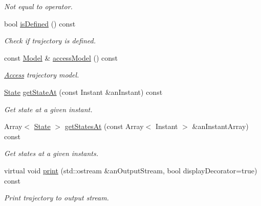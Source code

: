 \begin{DoxyCompactItemize}
\begin{DoxyCompactList}\small\item\em Not equal to operator. \end{DoxyCompactList}\item 
bool \hyperlink{classlibrary_1_1astro_1_1_trajectory_aab36edc2566e11d4b5de340cd8230dee}{is\+Defined} () const
\begin{DoxyCompactList}\small\item\em Check if trajectory is defined. \end{DoxyCompactList}\item 
const \hyperlink{classlibrary_1_1astro_1_1trajectory_1_1_model}{Model} \& \hyperlink{classlibrary_1_1astro_1_1_trajectory_ac5ebd6f282b52bb3d7c74a79375025e1}{access\+Model} () const
\begin{DoxyCompactList}\small\item\em \hyperlink{classlibrary_1_1astro_1_1_access}{Access} trajectory model. \end{DoxyCompactList}\item 
\hyperlink{classlibrary_1_1astro_1_1trajectory_1_1_state}{State} \hyperlink{classlibrary_1_1astro_1_1_trajectory_a5b27c8ad8d547a00ad32c4ab1d63984f}{get\+State\+At} (const Instant \&an\+Instant) const
\begin{DoxyCompactList}\small\item\em Get state at a given instant. \end{DoxyCompactList}\item 
Array$<$ \hyperlink{classlibrary_1_1astro_1_1trajectory_1_1_state}{State} $>$ \hyperlink{classlibrary_1_1astro_1_1_trajectory_a0b7d9ed6012f968b1bfde1f2cc4e34f5}{get\+States\+At} (const Array$<$ Instant $>$ \&an\+Instant\+Array) const
\begin{DoxyCompactList}\small\item\em Get states at a given instants. \end{DoxyCompactList}\item 
virtual void \hyperlink{classlibrary_1_1astro_1_1_trajectory_a6f6afc6bcd8880d7debaa98a79bfa4e6}{print} (std\+::ostream \&an\+Output\+Stream, bool display\+Decorator=true) const
\begin{DoxyCompactList}\small\item\em Print trajectory to output stream. \end{DoxyCompactList}\end{DoxyCompactItemize}
